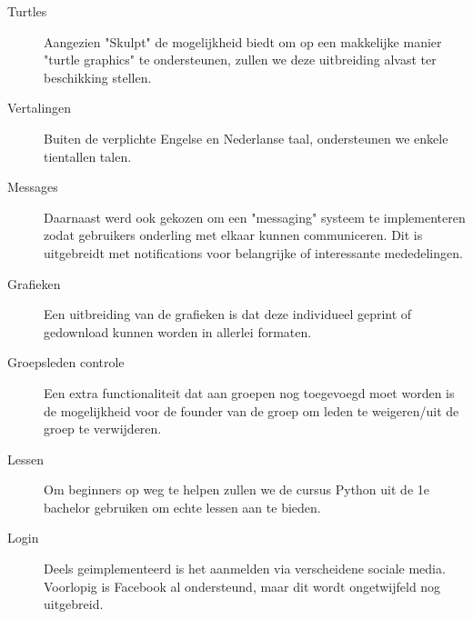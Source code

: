 \begin{description}
\item[Turtles] Aangezien "Skulpt" de mogelijkheid biedt om op een makkelijke manier "turtle graphics" te ondersteunen,
zullen we deze uitbreiding alvast ter beschikking stellen.
\item[Vertalingen] Buiten de verplichte Engelse en Nederlanse taal, ondersteunen we enkele tientallen talen.
\item[Messages] Daarnaast werd ook gekozen om een "messaging" systeem te implementeren zodat gebruikers onderling met elkaar
kunnen communiceren. Dit is uitgebreidt met notifications voor belangrijke of interessante mededelingen.
\item[Grafieken] Een uitbreiding van de grafieken is dat deze individueel geprint of gedownload kunnen worden in allerlei formaten.
\item[Groepsleden controle] Een extra functionaliteit dat aan groepen nog toegevoegd moet worden is de mogelijkheid voor de founder van de
groep om leden te weigeren/uit de groep te verwijderen.
\item[Lessen] Om beginners op weg te helpen zullen we de cursus Python uit de 1e bachelor gebruiken om echte lessen aan te bieden.
\item[Login] Deels geimplementeerd is het aanmelden via verscheidene sociale media. Voorlopig is Facebook al ondersteund, maar dit wordt
ongetwijfeld nog uitgebreid.
\end{description}
